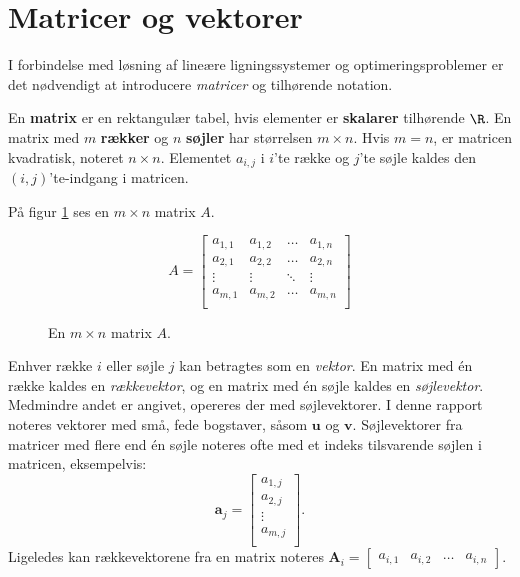 \section{Matricer og vektorer}
%
I forbindelse med løsning af lineære ligningssystemer og optimeringsproblemer er det nødvendigt at introducere \textit{matricer} og tilhørende notation. 
%
\begin{defn}{}{}
En \textbf{matrix} er en rektangulær tabel, hvis elementer er \textbf{skalarer} tilhørende $\R$. 
En matrix med $m$ \textbf{rækker} og $n$ \textbf{søjler} har størrelsen $m \times n$.
Hvis $m=n$, er matricen kvadratisk, noteret $n \times n$.
Elementet $a_{i,j}$ i $i$'te række og $j$'te søjle kaldes den $(i,j)$'te-indgang i matricen. 
\end{defn}
\noindent
%
På figur \ref{fig:matrix_gen_eks} ses en $m \times n$ matrix $A$.
%
\begin{figure}[H]
	\begin{center}
$$
A=
\begin{bmatrix}
a_{1,1} & a_{1,2} & \ldots & a_{1,n} \\
a_{2,1} & a_{2,2} & \ldots & a_{2,n} \\
\vdots  & \vdots  & \ddots & \vdots \\
a_{m,1} & a_{m,2} & \ldots & a_{m,n} \\
\end{bmatrix}
$$
	\end{center}
	\caption{En $m \times n$ matrix $A$.}
	\label{fig:matrix_gen_eks}
\end{figure}
%
\noindent
Enhver række $i$ eller søjle $j$ kan betragtes som en \textit{vektor}. 
En matrix med én række kaldes en \textit{rækkevektor}, og en matrix med én søjle kaldes en \textit{søjlevektor}. 
Medmindre andet er angivet, opereres der med søjlevektorer.
I denne rapport noteres vektorer med små, fede bogstaver, såsom $\textbf{u}$ og $\textbf{v}$. 
Søjlevektorer fra matricer med flere end én søjle noteres ofte med et indeks tilsvarende søjlen i matricen, eksempelvis:
%
$$
\textbf{a}_j= 
\begin{bmatrix}
a_{1,j} \\
a_{2,j} \\
\vdots \\
a_{m,j} \\
\end{bmatrix}.
$$
Ligeledes kan rækkevektorene fra en matrix noteres $\textbf{A}_i= 
\begin{bmatrix}
a_{i,1} &
a_{i,2} &
\ldots	&
a_{i,n}
\end{bmatrix}.$